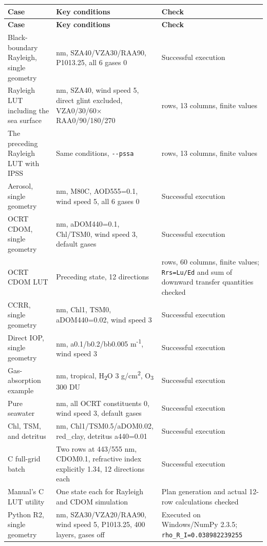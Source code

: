 {\TableFont
\begin{longtable}{@{}>{\raggedright\arraybackslash}p{}>{\raggedright\arraybackslash}p{}>{\raggedright\arraybackslash}p{}@{}}
\toprule
\textbf{Case} & \textbf{Key conditions} & \textbf{Check} \\
\midrule
\endfirsthead
\toprule
\textbf{Case} & \textbf{Key conditions} & \textbf{Check} \\
\midrule
\endhead
\bottomrule
\endfoot
Black-boundary Rayleigh, single geometry & 555 nm, SZA40/VZA30/RAA90, P1013.25, all 6 gases 0 & Successful execution \\
Rayleigh LUT including the sea surface & 555 nm, SZA40, wind speed 5, direct glint excluded, VZA0/\allowbreak{}30/\allowbreak{}60\ensuremath{\times}\allowbreak{}RAA0/\allowbreak{}90/\allowbreak{}180/\allowbreak{}270 & 12 rows, 13 columns, finite values \\
The preceding Rayleigh LUT with IPSS & Same conditions, \texttt{-\allowbreak{}-\allowbreak{}pssa} & 12 rows, 13 columns, finite values \\
Aerosol, single geometry & 555 nm, M80C, AOD555=0.1, wind speed 5, all 6 gases 0 & Successful execution \\
OCRT CDOM, single geometry & 555 nm, aDOM440=0.1, Chl/TSM0, wind speed 3, default gases & Successful execution \\
OCRT CDOM LUT & Preceding state, 12 directions & 12 rows, 60 columns, finite values; \texttt{Rrs=\allowbreak{}Lu/\allowbreak{}Ed} and sum of downward transfer quantities checked \\
CCRR, single geometry & 555 nm, Chl1, TSM0, aDOM440=0.02, wind speed 3 & Successful execution \\
Direct IOP, single geometry & 555 nm, a0.1/b0.2/bb0.005 m\textsuperscript{-}\textsuperscript{1}, wind speed 3 & Successful execution \\
Gas-absorption example & 760 nm, tropical, H\textsubscript{2}O 3 g/cm\textsuperscript{2}, O\textsubscript{3} 300 DU & Successful execution \\
Pure seawater & 555 nm, all OCRT constituents 0, wind speed 3, default gases & Successful execution \\
Chl, TSM, and detritus & 555 nm, Chl1/TSM0.5/aDOM0.02, red\_clay, detritus a440=0.01 & Successful execution \\
C full-grid batch & Two rows at 443/555 nm, CDOM0.1, refractive index explicitly 1.34, 12 directions each & Successful execution \\
Manual's C LUT utility & One state each for Rayleigh and CDOM simulation & Plan generation and actual 12-row calculations checked \\
Python R2, single geometry & 555 nm, SZA30/VZA20/RAA90, wind speed 5, P1013.25, 400 layers, gases off & Executed on Windows/NumPy 2.3.5; \texttt{rho\_\allowbreak{}R\_\allowbreak{}I=\allowbreak{}0.\allowbreak{}038982239255} \\
\end{longtable}
}

